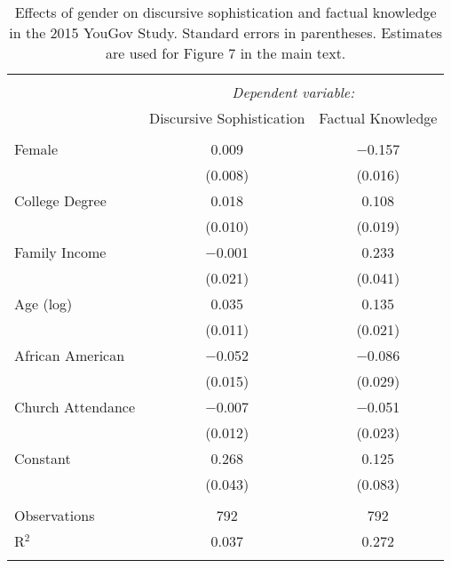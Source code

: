 
\begin{table}[!htbp] \centering 
  \caption{Effects of gender on discursive sophistication and factual knowledge in the
          2015 YouGov Study. Standard errors in parentheses. Estimates are used for
          Figure 7 in the main text.} 
  \label{tab:determinants_yg} 
\begin{tabular}{@{\extracolsep{0pt}}lcc} 
\\[-1.8ex]\hline 
\hline \\[-1.8ex] 
 & \multicolumn{2}{c}{\textit{Dependent variable:}} \\ 
\cline{2-3} 
 & Discursive Sophistication & Factual Knowledge \\ 
\hline \\[-1.8ex] 
 Female & 0.009 & $-$0.157 \\ 
  & (0.008) & (0.016) \\ 
  College Degree & 0.018 & 0.108 \\ 
  & (0.010) & (0.019) \\ 
  Family Income & $-$0.001 & 0.233 \\ 
  & (0.021) & (0.041) \\ 
  Age (log) & 0.035 & 0.135 \\ 
  & (0.011) & (0.021) \\ 
  African American & $-$0.052 & $-$0.086 \\ 
  & (0.015) & (0.029) \\ 
  Church Attendance & $-$0.007 & $-$0.051 \\ 
  & (0.012) & (0.023) \\ 
  Constant & 0.268 & 0.125 \\ 
  & (0.043) & (0.083) \\ 
 \hline \\[-1.8ex] 
Observations & 792 & 792 \\ 
R$^{2}$ & 0.037 & 0.272 \\ 
\hline 
\hline \\[-1.8ex] 
\end{tabular} 
\end{table} 
